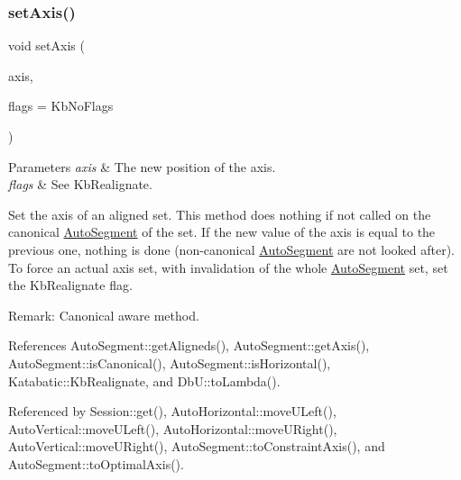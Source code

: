 \mbox{\label{classKatabatic_1_1AutoSegment_a3881efebb7510d9b22e5f89bcd418954}} 
\subsubsection{\texorpdfstring{set\+Axis()}{setAxis()}}
{\footnotesize\ttfamily void set\+Axis (\begin{DoxyParamCaption}\item[{\textbf{ Db\+U\+::\+Unit}}]{axis,  }\item[{unsigned int}]{flags = {\ttfamily KbNoFlags} }\end{DoxyParamCaption})}


\begin{DoxyParams}{Parameters}
{\em axis} & The new position of the axis. \\
\hline
{\em flags} & See Kb\+Realignate.\\
\hline
\end{DoxyParams}
Set the axis of an aligned set. This method does nothing if not called on the canonical \hyperlink{classKatabatic_1_1AutoSegment}{Auto\+Segment} of the set. If the new value of the axis is equal to the previous one, nothing is done (non-\/canonical \hyperlink{classKatabatic_1_1AutoSegment}{Auto\+Segment} are not looked after). To force an actual axis set, with invalidation of the whole \hyperlink{classKatabatic_1_1AutoSegment}{Auto\+Segment} set, set the Kb\+Realignate flag.

\begin{DoxyParagraph}{Remark\+:}
Canonical aware method. 
\end{DoxyParagraph}


References Auto\+Segment\+::get\+Aligneds(), Auto\+Segment\+::get\+Axis(), Auto\+Segment\+::is\+Canonical(), Auto\+Segment\+::is\+Horizontal(), Katabatic\+::\+Kb\+Realignate, and Db\+U\+::to\+Lambda().



Referenced by Session\+::get(), Auto\+Horizontal\+::move\+U\+Left(), Auto\+Vertical\+::move\+U\+Left(), Auto\+Horizontal\+::move\+U\+Right(), Auto\+Vertical\+::move\+U\+Right(), Auto\+Segment\+::to\+Constraint\+Axis(), and Auto\+Segment\+::to\+Optimal\+Axis().

\mbox{\label{classKatabatic_1_1AutoSegment_a8ab41a962e18810808f4f065863b5a73}} 
